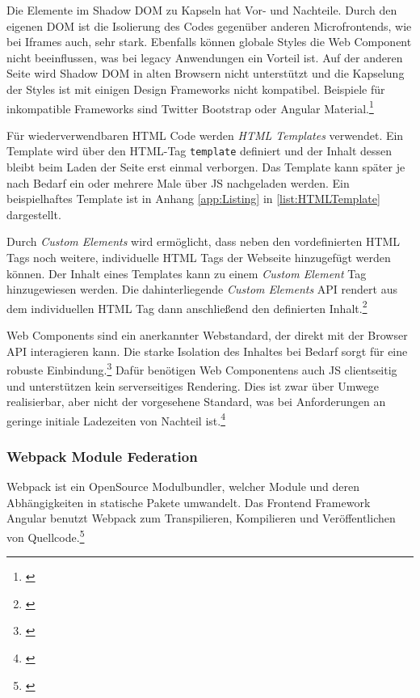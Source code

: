 Die Elemente im Shadow \gls{DOM} zu Kapseln hat Vor- und Nachteile. Durch den eigenen \gls{DOM} ist die Isolierung des Codes gegenüber anderen Microfrontends, wie bei Iframes auch, sehr stark. Ebenfalls können globale Styles die Web Component nicht beeinflussen, was bei legacy Anwendungen ein Vorteil ist. 
Auf der anderen Seite wird Shadow \gls{DOM} in alten Browsern nicht unterstützt und die Kapselung der Styles ist mit einigen Design Frameworks nicht kompatibel. Beispiele für inkompatible Frameworks sind Twitter Bootstrap oder Angular Material.\footnote{\cite[vgl.][96]{Geers2020}}

Für wiederverwendbaren \gls{HTML} Code werden \textit{\gls{HTML} Templates} verwendet. Ein Template wird über den \gls{HTML}-Tag \texttt{template} definiert und der Inhalt dessen bleibt beim Laden der Seite erst einmal verborgen. Das Template kann später je nach Bedarf ein oder mehrere Male über \gls{JS} nachgeladen werden. Ein beispielhaftes Template ist in Anhang \ref{app:Listing} in \cref{list:HTMLTemplate} dargestellt.

Durch \textit{Custom Elements} wird ermöglicht, dass neben den vordefinierten \gls{HTML} Tags noch weitere, individuelle \gls{HTML} Tags der Webseite hinzugefügt werden können. Der Inhalt eines Templates kann zu einem \textit{Custom Element} Tag hinzugewiesen werden. Die dahinterliegende \textit{Custom Elements} API rendert aus dem individuellen \gls{HTML} Tag dann anschließend den definierten Inhalt.\footnote{\cite[vgl.][]{Rauber2021}}

Web Components sind ein anerkannter Webstandard, der direkt mit der Browser \gls{API} interagieren kann. Die starke Isolation des Inhaltes bei Bedarf sorgt für eine robuste Einbindung.\footnote{\cite[vgl.][96\psq]{Geers2020}} Dafür benötigen Web Componentens auch \gls{JS} clientseitig und unterstützen kein serverseitiges Rendering. Dies ist zwar über Umwege realisierbar, aber nicht der vorgesehene Standard, was bei Anforderungen an geringe initiale Ladezeiten von Nachteil ist.\footnote{\cite[vgl.][97\psq]{Geers2020}}

\subsubsection{Webpack Module Federation}\label{sec:ModuleFederation}

Webpack ist ein OpenSource Modulbundler, welcher Module und deren Abhängigkeiten in statische Pakete umwandelt. Das Frontend Framework Angular benutzt Webpack zum Transpilieren, Kompilieren und Veröffentlichen von Quellcode.\footnote{\cite[vgl.][133]{Clow2018}}

